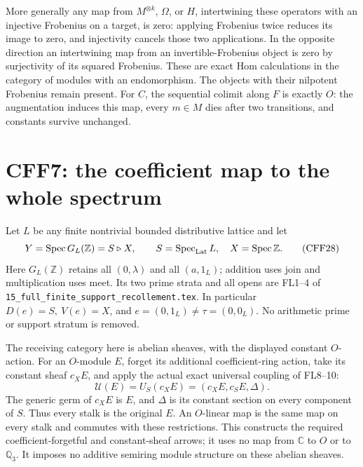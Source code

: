 \documentclass[11pt]{article}
\newcommand{\KK}{\mathbb Q_3}
\newcommand{\Spec}{\operatorname{Spec}}
\newcommand{\SpecLat}{\operatorname{Spec}_{\rm Lat}}
\begin{document}
More generally any map from \(M^{\otimes k}\), \(\Omega\), or
\(H\), intertwining these operators with an injective
Frobenius on a target, is zero: applying Frobenius twice
reduces its image to zero, and injectivity cancels those two
applications. In the opposite direction an intertwining
map from an invertible-Frobenius object is zero by
surjectivity of its squared Frobenius. These are exact Hom
calculations in the category of modules with an endomorphism.
The objects with their nilpotent Frobenius remain present.
For \(C\), the sequential colimit along \(F\) is exactly \(O\):
the augmentation induces this map, every \(m\in M\) dies
after two transitions, and constants survive unchanged.

\section{CFF7: the coefficient map to the whole spectrum}
Let \(L\) be any finite nontrivial bounded distributive
lattice and let
\[
 Y=\Spec G_L(\mathbb Z)=S\triangleright X,\qquad
 S=\SpecLat L,\quad X=\Spec\mathbb Z.
 \tag{CFF28}
\]
Here \(G_L(\mathbb Z)\) retains all \((0,\lambda)\) and all
\((a,1_L)\); addition uses join and multiplication uses meet.
Its two prime strata and all opens are FL1--4 of
\texttt{15\_full\_finite\_support\_recollement.tex}.
In particular \(D(e)=S,\ V(e)=X\), and \(e=(0,1_L)\ne
\tau=(0,0_L)\). No arithmetic prime or support stratum is
removed.

The receiving category here is abelian sheaves, with the
displayed constant \(O\)-action. For an \(O\)-module \(E\),
forget its additional coefficient-ring action, take its
constant sheaf \(c_XE\), and apply the actual exact universal
coupling of FL8--10:
\[
 \mathcal U(E)=U_S(c_XE)
       =(c_XE,c_SE,\Delta).
 \tag{CFF29}
\]
The generic germ of \(c_XE\) is \(E\), and \(\Delta\) is its
constant section on every component of \(S\). Thus every
stalk is the original \(E\). An \(O\)-linear map is the same
map on every stalk and commutes with these restrictions.
This constructs the required coefficient-forgetful and
constant-sheaf arrows; it uses no map from \(\mathbb C\)
to \(O\) or to \(\KK\). It imposes no additive semiring
module structure on these abelian sheaves.
\end{document}
